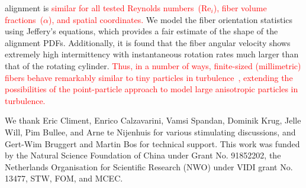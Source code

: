 \documentclass[aps, pre, onecolumn, superscriptaddress,longbibliography]{revtex4-1}
\newcommand{\makered}[1]{\textcolor{red}{#1}}
\begin{document}
alignment is \makered{similar for all tested Reynolds numbers~($\text{Re}_i$), fiber
volume fractions~($\alpha$), and spatial coordinates.}
We model the fiber orientation statistics using
Jeffery's equations, which provides a fair estimate of the shape of the
alignment PDFs. Additionally, it is found that the fiber angular velocity
shows extremely high intermittency with instantaneous rotation rates much larger than that of the rotating cylinder. \makered{Thus, in a number of ways,
finite-sized (millimetric) fibers behave remarkably similar to tiny particles
in turbulence~\cite{Voth2017,Toschi2009}, extending the possibilities of the
point-particle approach to model large anisotropic particles in turbulence.}
\begin{acknowledgments}
We thank Eric Climent, Enrico Calzavarini, Vamsi Spandan, Dominik Krug, Jelle Will, Pim Bullee, and Arne te Nijenhuis for various stimulating discussions, and Gert-Wim Bruggert and Martin Bos for technical support. This work was funded by the Natural Science Foundation of China under Grant No. 91852202, the Netherlands Organisation for Scientific Research (NWO) under VIDI grant No. 13477,  STW, FOM, and MCEC.
\end{acknowledgments}










\end{document}
